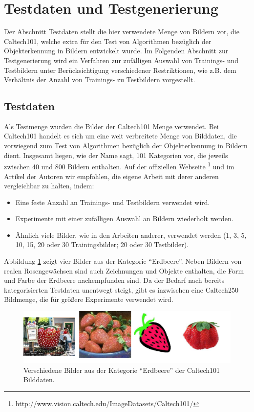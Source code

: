 \section{Testdaten und Testgenerierung}

Der Abschnitt Testdaten stellt die hier verwendete Menge von Bildern vor, die Caltech101, welche extra für den Test von Algorithmen bezüglich der Objekterkennung in Bildern entwickelt wurde.\newline
Im Folgenden Abschnitt zur Testgenerierung wird ein Verfahren zur zufälligen Auswahl von Trainings- und Testbildern unter Berücksichtigung verschiedener Restriktionen, wie z.B. dem Verhältnis der Anzahl von Trainings- zu Testbildern vorgestellt.

\subsection{Testdaten}

Als Testmenge wurden die Bilder der Caltech101 Menge verwendet. Bei Caltech101 handelt es sich um eine weit verbreitete Menge von Bilddaten, die vorwiegend zum Test von Algorithmen bezüglich der Objekterkennung in Bildern dient. Insgesamt liegen, wie der Name sagt, 101 Kategorien vor, die jeweils zwischen 40 und 800 Bildern enthalten. Auf der offiziellen Webseite \footnote{http://www.vision.caltech.edu/Image\textunderscore Datasets/Caltech101/} und im Artikel der Autoren wir empfohlen, die eigene Arbeit mit derer anderen vergleichbar zu halten, indem:

\begin{itemize}
	\item Eine feste Anzahl an Trainings- und Testbildern verwendet wird.
	\item Experimente mit einer zufälligen Auswahl an Bildern wiederholt werden.
	\item Ähnlich viele Bilder, wie in den Arbeiten anderer, verwendet werden (1, 3, 5, 10, 15, 20 oder 30 Trainingsbilder; 20 oder 30 Testbilder).
\end{itemize}

Abbildung \ref{img:strawberries} zeigt vier Bilder aus der Kategorie \enquote{Erdbeere}. Neben Bildern von realen Rosengewächsen sind auch Zeichnungen und Objekte enthalten, die Form und Farbe der Erdbeere nachempfunden sind. 
Da der Bedarf nach bereits kategorisierten Testdaten unentwegt steigt, gibt es inzwischen eine Caltech250 Bildmenge, die für größere Experimente verwendet wird.

\begin{figure}
	\centering
	\includegraphics[scale=0.5]{images/strawberry.png}
	\caption{Verschiedene Bilder aus der Kategorie \enquote{Erdbeere} der Caltech101 Bilddaten.}
	\label{img:strawberries}
\end{figure}

